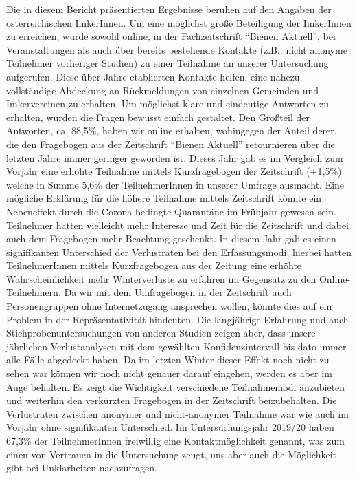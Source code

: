 Die in diesem Bericht präsentierten Ergebnisse beruhen auf den Angaben der österreichischen ImkerInnen. Um eine möglichst große Beteiligung der ImkerInnen zu erreichen, wurde sowohl online, in der Fachzeitschrift \enquote{Bienen Aktuell}, bei Veranstaltungen als auch über bereits bestehende Kontakte (z.B.: nicht anonyme Teilnehmer vorheriger Studien) zu einer Teilnahme an unserer Untersuchung aufgerufen. Diese über Jahre etablierten Kontakte helfen, eine nahezu vollständige Abdeckung an Rückmeldungen von einzelnen Gemeinden und Imkervereinen zu erhalten. Um möglichst klare und eindeutige Antworten zu erhalten, wurden die Fragen bewusst einfach gestaltet. Den Großteil der Antworten, ca. 88,5\%, haben wir online erhalten, wohingegen der Anteil derer, die den Fragebogen aus der Zeitschrift \enquote{Bienen Aktuell} retournieren über die letzten Jahre immer geringer geworden ist. Dieses Jahr gab es im Vergleich zum Vorjahr eine erhöhte Teilnahme mittels Kurzfragebogen der Zeitschrift (+1,5\%) welche in Summe 5,6\% der TeilnehmerInnen in unserer Umfrage ausmacht. Eine mögliche Erklärung für die höhere Teilnahme mittels Zeitschrift könnte ein Nebeneffekt durch die Corona bedingte Quarantäne im Frühjahr gewesen sein. Teilnehmer hatten vielleicht mehr Interesse und Zeit für die Zeitschrift und dabei auch dem Fragebogen mehr Beachtung geschenkt.
\newline
In diesem Jahr gab es einen signifikanten Unterschied der Verlustraten bei den Erfassungsmodi, hierbei hatten TeilnehmerInnen mittels Kurzfragebogen aus der Zeitung eine erhöhte Wahrscheinlichkeit mehr Winterverluste zu erfahren im Gegensatz zu den Online-Teilnehmern. Da wir mit dem Umfragebogen in der Zeitschrift auch Personengruppen ohne Internetzugang ansprechen wollen, könnte dies auf ein Problem in der Repräsentativität hindeuten. Die langjährige Erfahrung und auch Stichprobenuntersuchungen von anderen Studien zeigen aber, dass unsere jährlichen Verlustanalysen mit dem gewählten Konfidenzintervall bis dato immer alle Fälle abgedeckt haben. Da im letzten Winter dieser Effekt noch nicht zu sehen war können wir noch nicht genauer darauf eingehen, werden es aber im Auge behalten. Es zeigt die Wichtigkeit verschiedene Teilnahmemodi anzubieten und weiterhin den verkürzten Fragebogen in der Zeitschrift beizubehalten. Die Verlustraten zwischen anonymer und nicht-anonymer Teilnahme war wie auch im Vorjahr ohne signifikanten Unterschied. Im Untersuchungsjahr 2019/20 haben 67,3\% der TeilnehmerInnen freiwillig eine Kontaktmöglichkeit genannt, was zum einen von Vertrauen in die Untersuchung zeugt, uns aber auch die Möglichkeit gibt bei Unklarheiten nachzufragen.
